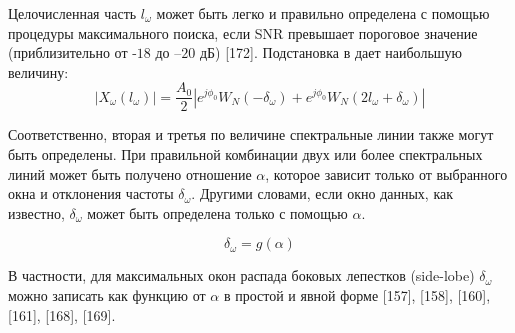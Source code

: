 Целочисленная часть $l_\omega$ может быть легко и правильно определена с помощью процедуры максимального поиска, если SNR превышает пороговое значение (приблизительно от -$18$ до –$20$ дБ) [172]. 
Подстановка  в  дает наибольшую величину:
\begin{equation}
\label{eq:equation19}
\left|{X_\omega(l_\omega)} \right| = \frac{A_0}{2} \left| e^{j\phi_0}W_N(- \delta_\omega) +e^{j\phi_0}W_N(2l_\omega+\delta_\omega) \right| 
\end{equation}

Соответственно, вторая и третья по величине спектральные линии также могут быть определены. При правильной комбинации двух или более спектральных линий может быть получено отношение $\alpha$, которое зависит только от выбранного окна и отклонения частоты $\delta_{\omega}$. Другими словами, если окно данных, как известно, $\delta_{\omega}$ может быть определена только с помощью $\alpha$.

\begin{equation}
\label{eq:equation20}
\delta_\omega = g(\alpha)
\end{equation}

В частности, для максимальных окон распада боковых лепестков (side-lobe) $\delta_{\omega}$ можно записать как функцию от $\alpha$ в простой и явной форме [157], [158], [160], [161], [168], [169].






